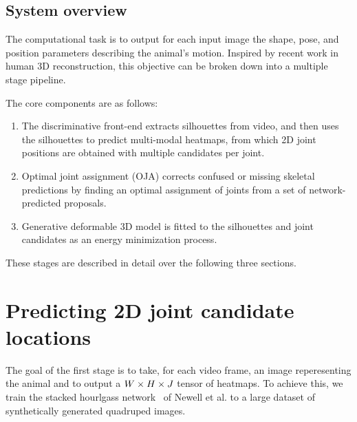 \subsection{System overview}



The computational task is to output for each input image the shape, pose, and position parameters describing the animal's motion. Inspired by recent work in human 3D reconstruction, this objective can be broken down into a multiple stage pipeline. 

The core components are as follows:

\begin{enumerate}
    \item The discriminative front-end extracts silhouettes from video, and then uses the silhouettes to predict multi-modal heatmaps, from which 2D joint positions are obtained with multiple candidates per joint. 
    \item Optimal joint assignment (OJA) corrects confused or missing skeletal predictions by finding an optimal assignment of joints from a set of network-predicted proposals. 
    \item Generative deformable 3D model is fitted to the silhouettes and joint candidates as an energy minimization process.
\end{enumerate}

These stages are described in detail over the following three sections.

\section{Predicting 2D joint candidate locations}

The goal of the first stage is to take, for each video frame, an image reperesenting the animal and to output a $W \times H \times J$ tensor of heatmaps. To achieve this, we train the stacked hourlgass network~\cite{newell2016stacked} of Newell et al. to a large dataset of synthetically generated quadruped images. 

